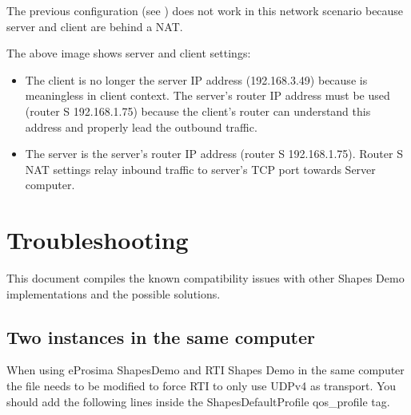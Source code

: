 \documentclass[letterpaper,10pt,english]{sphinxmanual}
\begin{document}
The previous configuration (see {\hyperref[\detokenize{tcp_LAN_WAN_transport:lan-configuration}]{}}) does not work in this network scenario because server and client are behind a NAT.


The above image shows server and client settings:
\begin{itemize}
\item {} 
The client  is no longer the server IP address (192.168.3.49) because is meaningless in client context. The server’s router IP address must be used (router S 192.168.1.75) because the client’s router can understand this address and properly lead the outbound traffic.

\item {} 
The server  is the server’s router IP address (router S 192.168.1.75). Router S NAT settings relay inbound traffic to server’s TCP port towards Server computer.

\end{itemize}
\label{\detokenize{index:troubleshooting}}

\chapter{Troubleshooting}
\label{\detokenize{troubleshooting:troubleshooting}}\label{\detokenize{troubleshooting::doc}}
This document compiles the known compatibility issues with other Shapes Demo implementations and the possible solutions.


\section{Two instances in the same computer}
\label{\detokenize{troubleshooting:two-instances-in-the-same-computer}}
When using eProsima ShapesDemo and RTI Shapes Demo in the same computer the file  needs to be modified to force RTI to only use UDPv4 as transport.
You should add the following lines inside the ShapesDefaultProfile qos\_profile tag.
\end{document}
